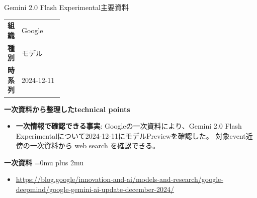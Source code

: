 \begin{technicalnote}{Gemini 2.0 Flash Experimental}{主要資料}
\begingroup
\begin{tabularx}{\linewidth}{@{}>{\bfseries}p{0.22\linewidth}X@{}}
組織 & Google \\
種別 & モデル \\
時系列 & 2024-12-11 \\
\end{tabularx}
\smallskip
{\bfseries 一次資料から整理したtechnical points}
\begin{itemize}[leftmargin=1.5em,itemsep=0.35em]
\item \textbf{一次情報で確認できる事実}: Googleの一次資料により、Gemini 2.0 Flash Experimentalについて2024-12-11にモデルPreviewを確認した。 対象event近傍の一次資料から web search を確認できる。
\end{itemize}
\begin{minipage}{\linewidth}
\begin{samepage}
{\bfseries 一次資料}
\begingroup\sloppy
\Urlmuskip=0mu plus 2mu\relax
\begin{itemize}[leftmargin=1.5em,itemsep=0.25em]
\item {\scriptsize\url{https://blog.google/innovation-and-ai/models-and-research/google-deepmind/google-gemini-ai-update-december-2024/}}
\end{itemize}
\endgroup
\end{samepage}
\end{minipage}
\endgroup
\end{technicalnote}
\medskip

